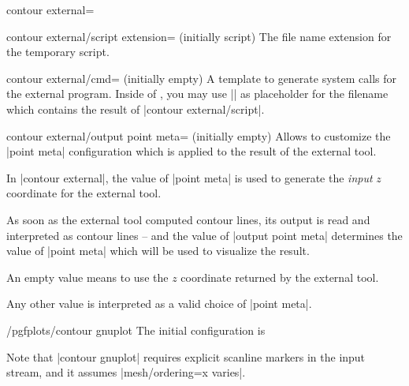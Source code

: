 {{\begin{plottype}[/pgfplots]{contour external=\textcolor{black}{}}
	\begin{pgfplotskey}{contour external/script extension= (initially script)}
		The file name extension for the temporary script.
	\end{pgfplotskey}

	\begin{pgfplotskey}{contour external/cmd= (initially empty)}
		A template to generate system calls for the external program. Inside of , you may use |\script| as placeholder for the filename which contains the result of |contour external/script|.
	\end{pgfplotskey}

	\begin{pgfplotskey}{contour external/output point meta= (initially empty)}
		Allows to customize the |point meta| configuration which is applied to the result of the external tool.

		In |contour external|, the value of |point meta| is used to generate the \emph{input} $z$ coordinate for the external tool.

		As soon as the external tool computed contour lines, its output is read and interpreted as contour lines -- and the value of |output point meta| determines the value of |point meta| which will be used to visualize the result. 

		An empty value means to use the $z$ coordinate returned by the external tool.

		Any other value is interpreted as a valid choice of |point meta|.
	\end{pgfplotskey}

	\begin{stylekey}{/pgfplots/contour gnuplot}
		\label{key:pgfplots:contour:gnuplot}
		The initial configuration is
\begin{codeexample}
\end{codeexample}
	Note that |contour gnuplot| requires explicit scanline markers in the input stream, and it assumes |mesh/ordering=x varies|.
	\end{stylekey}


\end{plottype}}}
